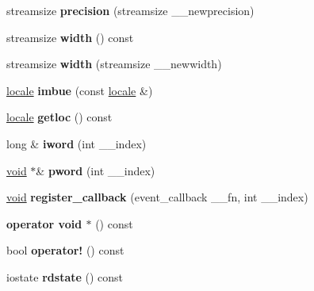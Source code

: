 \begin{DoxyCompactItemize}
\mbox{\label{classios__base_ab0ac969d698ccb6e67d596850a00e5d7}} 
streamsize {\bfseries precision} (streamsize \+\_\+\+\_\+newprecision)
\item 
\mbox{\label{classios__base_a5e26dac22a8b4548f63a8fc55e8a7b69}} 
streamsize {\bfseries width} () const
\item 
\mbox{\label{classios__base_a186fc9038331ff790854832f27ed44c7}} 
streamsize {\bfseries width} (streamsize \+\_\+\+\_\+newwidth)
\item 
\mbox{\label{classios__base_aad41990008dd06d2411cd38f9f9b8d87}} 
\hyperlink{classlocale}{locale} {\bfseries imbue} (const \hyperlink{classlocale}{locale} \&)
\item 
\mbox{\label{classios__base_a98f105ca8cca72e921f154c84baf548a}} 
\hyperlink{classlocale}{locale} {\bfseries getloc} () const
\item 
\mbox{\label{classios__base_a24c60d5fe56db3eb05e0339dda5aee59}} 
long \& {\bfseries iword} (int \+\_\+\+\_\+index)
\item 
\mbox{\label{classios__base_adfed410ad06e65527f11f03d66c924bf}} 
\hyperlink{interfacevoid}{void} $\ast$\& {\bfseries pword} (int \+\_\+\+\_\+index)
\item 
\mbox{\label{classios__base_a34fbbdff938e7a55c437d356d2943a37}} 
\hyperlink{interfacevoid}{void} {\bfseries register\+\_\+callback} (event\+\_\+callback \+\_\+\+\_\+fn, int \+\_\+\+\_\+index)
\item 
\mbox{\label{classios__base_a670467ce1f38511da36c85d136767561}} 
{\bfseries operator void $\ast$} () const
\item 
\mbox{\label{classios__base_ac86f326e107f2a09dfc34eb11bd46b90}} 
bool {\bfseries operator!} () const
\item 
\mbox{\label{classios__base_a0d520956ef7c6a63884adbc95014657e}} 
iostate {\bfseries rdstate} () const
\item 

\end{DoxyCompactItemize}
